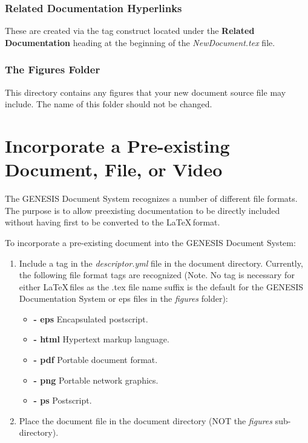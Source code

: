 \documentclass[12pt]{article}
\begin{document}
\subsubsection*{Related Documentation Hyperlinks}

These are created via the tag construct located under the {\bf Related Documentation} heading at the beginning of the {\it NewDocument.tex} file. 

\subsubsection*{The Figures Folder}

This directory contains any figures that your new document source file may include. The name of this folder should not be changed.

\section*{Incorporate a Pre-existing Document, File, or Video}

The GENESIS Document System recognizes a number of different file formats. The purpose is to allow preexisting documentation to be directly included without having first to be converted to the \LaTeX\,format.

To incorporate a pre-existing document into the GENESIS Document System:

\begin{enumerate}

\item Include a tag in the {\it descriptor.yml} file in the document directory. Currently, the following file format tags are recognized (Note. No tag is necessary for either \LaTeX\,files as the .tex file name suffix is the default for the GENESIS Documentation System or eps files in the {\it figures} folder):

\begin{itemize}

\item[]{\bf - eps} Encapsulated postscript.
\item[]{\bf - html} Hypertext markup language.
\item[]{\bf - pdf} Portable document format.
\item[]{\bf - png} Portable network graphics.
\item[]{\bf - ps} Postscript.

\end{itemize}

\item Place the document file in the document directory (NOT the {\it figures} sub-directory).

\end{enumerate}
\end{document}
